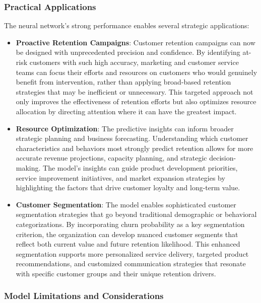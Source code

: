 \documentclass[
]{article}
\providecommand{\tightlist}{%
  \setlength{\itemsep}{0pt}\setlength{\parskip}{0pt}}
\begin{document}
\hypertarget{practical-applications}{%
\subsubsection{Practical Applications}\label{practical-applications}}

The neural network's strong performance enables several strategic
applications:

\begin{itemize}
\tightlist
\item
  \textbf{Proactive Retention Campaigns}: Customer retention campaigns
  can now be designed with unprecedented precision and confidence. By
  identifying at-risk customers with such high accuracy, marketing and
  customer service teams can focus their efforts and resources on
  customers who would genuinely benefit from intervention, rather than
  applying broad-based retention strategies that may be inefficient or
  unnecessary. This targeted approach not only improves the
  effectiveness of retention efforts but also optimizes resource
  allocation by directing attention where it can have the greatest
  impact.
\item
  \textbf{Resource Optimization}: The predictive insights can inform
  broader strategic planning and business forecasting. Understanding
  which customer characteristics and behaviors most strongly predict
  retention allows for more accurate revenue projections, capacity
  planning, and strategic decision-making. The model's insights can
  guide product development priorities, service improvement initiatives,
  and market expansion strategies by highlighting the factors that drive
  customer loyalty and long-term value.
\item
  \textbf{Customer Segmentation}: The model enables sophisticated
  customer segmentation strategies that go beyond traditional
  demographic or behavioral categorizations. By incorporating churn
  probability as a key segmentation criterion, the organization can
  develop nuanced customer segments that reflect both current value and
  future retention likelihood. This enhanced segmentation supports more
  personalized service delivery, targeted product recommendations, and
  customized communication strategies that resonate with specific
  customer groups and their unique retention drivers.
\end{itemize}

\hypertarget{model-limitations-and-considerations}{%
\subsubsection{Model Limitations and
Considerations}\label{model-limitations-and-considerations}}
\end{document}
